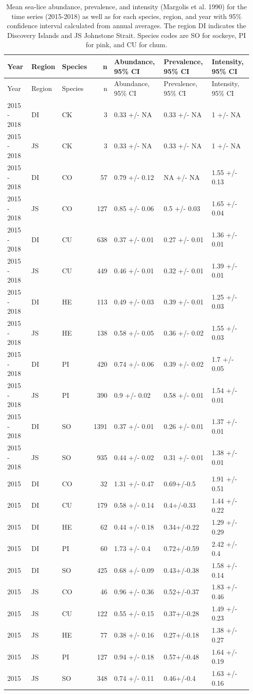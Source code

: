 \documentclass[fleqn,10pt]{wlpeerj} %
\begin{document}
\begin{longtable}[]{@{}lllrlll@{}}
\caption{\label{tab:parasites} Mean sea-lice abundance, prevalence, and
intensity (Margolis et al. 1990) for the time series (2015-2018) as well
as for each species, region, and year with 95\% confidence interval
calculated from annual averages. The region DI indicates the Discovery
Islands and JS Johnstone Strait. Species codes are SO for sockeye, PI
for pink, and CU for chum.}\tabularnewline
\toprule
Year & Region & Species & n & Abundance, 95\% CI & Prevalence, 95\% CI &
Intensity, 95\% CI\tabularnewline
\midrule
\endfirsthead
\toprule
Year & Region & Species & n & Abundance, 95\% CI & Prevalence, 95\% CI &
Intensity, 95\% CI\tabularnewline
\midrule
\endhead
2015 - 2018 & DI & CK & 3 & 0.33 +/- NA & 0.33 +/- NA & 1 +/-
NA\tabularnewline
2015 - 2018 & JS & CK & 3 & 0.33 +/- NA & 0.33 +/- NA & 1 +/-
NA\tabularnewline
2015 - 2018 & DI & CO & 57 & 0.79 +/- 0.12 & NA +/- NA & 1.55 +/-
0.13\tabularnewline
2015 - 2018 & JS & CO & 127 & 0.85 +/- 0.06 & 0.5 +/- 0.03 & 1.65 +/-
0.04\tabularnewline
2015 - 2018 & DI & CU & 638 & 0.37 +/- 0.01 & 0.27 +/- 0.01 & 1.36 +/-
0.01\tabularnewline
2015 - 2018 & JS & CU & 449 & 0.46 +/- 0.01 & 0.32 +/- 0.01 & 1.39 +/-
0.01\tabularnewline
2015 - 2018 & DI & HE & 113 & 0.49 +/- 0.03 & 0.39 +/- 0.01 & 1.25 +/-
0.03\tabularnewline
2015 - 2018 & JS & HE & 138 & 0.58 +/- 0.05 & 0.36 +/- 0.02 & 1.55 +/-
0.03\tabularnewline
2015 - 2018 & DI & PI & 420 & 0.74 +/- 0.06 & 0.39 +/- 0.02 & 1.7 +/-
0.05\tabularnewline
2015 - 2018 & JS & PI & 390 & 0.9 +/- 0.02 & 0.58 +/- 0.01 & 1.54 +/-
0.01\tabularnewline
2015 - 2018 & DI & SO & 1391 & 0.37 +/- 0.01 & 0.26 +/- 0.01 & 1.37 +/-
0.01\tabularnewline
2015 - 2018 & JS & SO & 935 & 0.44 +/- 0.02 & 0.31 +/- 0.01 & 1.38 +/-
0.01\tabularnewline
2015 & DI & CO & 32 & 1.31 +/- 0.47 & 0.69+/-0.5 & 1.91 +/-
0.51\tabularnewline
2015 & DI & CU & 179 & 0.58 +/- 0.14 & 0.4+/-0.33 & 1.44 +/-
0.22\tabularnewline
2015 & DI & HE & 62 & 0.44 +/- 0.18 & 0.34+/-0.22 & 1.29 +/-
0.29\tabularnewline
2015 & DI & PI & 60 & 1.73 +/- 0.4 & 0.72+/-0.59 & 2.42 +/-
0.4\tabularnewline
2015 & DI & SO & 425 & 0.68 +/- 0.09 & 0.43+/-0.38 & 1.58 +/-
0.14\tabularnewline
2015 & JS & CO & 46 & 0.96 +/- 0.36 & 0.52+/-0.37 & 1.83 +/-
0.46\tabularnewline
2015 & JS & CU & 122 & 0.55 +/- 0.15 & 0.37+/-0.28 & 1.49 +/-
0.23\tabularnewline
2015 & JS & HE & 77 & 0.38 +/- 0.16 & 0.27+/-0.18 & 1.38 +/-
0.27\tabularnewline
2015 & JS & PI & 127 & 0.94 +/- 0.18 & 0.57+/-0.48 & 1.64 +/-
0.19\tabularnewline
2015 & JS & SO & 348 & 0.74 +/- 0.11 & 0.46+/-0.4 & 1.63 +/-
0.16\tabularnewline

\end{longtable}
\end{document}
